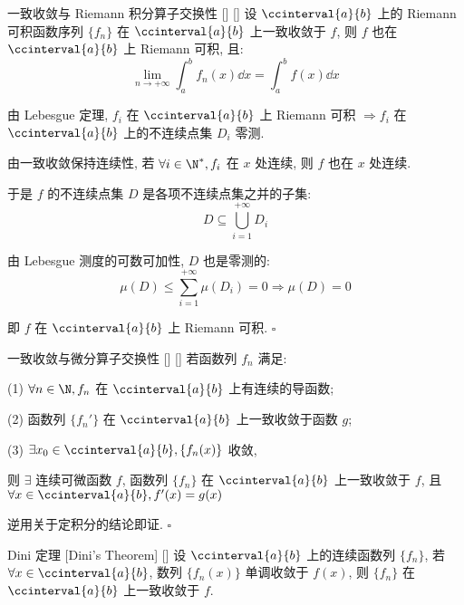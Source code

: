 \documentclass[UTF8]{ctexart}
\begin{document}
			\begin{ppt}
			    []
			    {一致收敛与 Riemann 积分算子交换性}
			    []
			    []
				设 \(\ccinterval{a}{b}\) 上的 Riemann 可积函数序列 \(\{f_n\}\) 在 \(\ccinterval{a}{b}	\) 上一致收敛于 \(f\), 则 \(f\) 也在 \(\ccinterval{a}{b}\) 上 Riemann 可积, 且: 
				\[\lim_{n\to+\infty}\int_a^b f_n(x)\dd x=\int_a^b f(x)\dd x\]
			\end{ppt}

			\begin{prf}
				由 Lebesgue 定理, \(f_i\) 在 \(\ccinterval{a}{b}\) 上 Riemann 可积 \(\Longrightarrow f_i\) 在 \(\ccinterval{a}{b}\) 上的不连续点集 \(D_i\) 零测. 

				由一致收敛保持连续性, 若 \(\forall i\in\N^*, f_i\) 在 \(x\) 处连续, 则 \(f\) 也在 \(x\) 处连续. 
				
				于是 \(f\) 的不连续点集 \(D\) 是各项不连续点集之并的子集: 
				\[D\subseteq\bigcup_{i=1}^{+\infty} D_i\]

				由 Lebesgue 测度的可数可加性, \(D\) 也是零测的: 
				\[\mu(D)\leq\sum_{i=1}^{+\infty}\mu(D_i)=0\Longrightarrow\mu(D)=0\]

				即 \(f\) 在 \(\ccinterval{a}{b}\) 上 Riemann 可积. \(\square\)
			\end{prf}

			\begin{ppt}
			    []
			    {一致收敛与微分算子交换性}
			    []
			    []
				若函数列 \(f_n\) 满足: 

				(1) \(\forall n\in\N, f_n\) 在 \(\ccinterval{a}{b}\) 上有连续的导函数; 

				(2) 函数列 \(\{f_n'\}\) 在 \(\ccinterval{a}{b}\) 上一致收敛于函数 \(g\); 

				(3) \(\exists x_0\in\ccinterval{a}{b}, \{f_n(x)\}\) 收敛, 

				则 \(\exists\) 连续可微函数 \(f\), 函数列 \(\{f_n\}\) 在 \(\ccinterval{a}{b}\) 上一致收敛于 \(f\), 且 \(\forall x\in\ccinterval{a}{b}, f'(x)=g(x)\)
			\end{ppt}

			\begin{prf}
				逆用关于定积分的结论即证. \(\square\)
			\end{prf}

			\begin{thm}
			    []
			    {Dini 定理 }
			    [Dini's Theorem]
			    []
				设 \(\ccinterval{a}{b}\) 上的连续函数列 \(\{f_n\}\), 若 \(\forall x\in\ccinterval{a}{b}\), 数列 \(\{f_n(x)\}\) 单调收敛于 \(f(x)\), 则 \(\{f_n\}\) 在 \(\ccinterval{a}{b}\) 上一致收敛于 \(f\). 
			\end{thm}
\end{document}
